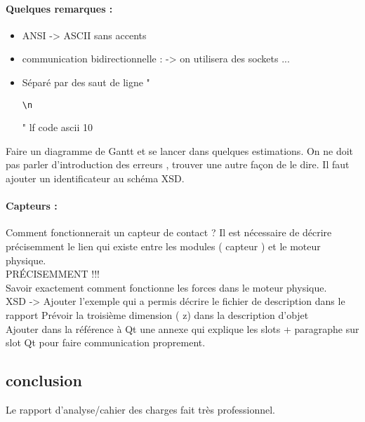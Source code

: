 \documentclass[a4paper,10pt]{article}
\begin{document}
\paragraph{Quelques remarques :}
\begin{itemize}
\item ANSI -> ASCII sans accents
\item communication bidirectionnelle : -> on utilisera des sockets {...}
\item Séparé par des saut de ligne "\begin{verbatim}\n\end{verbatim}" lf code ascii 10
\end{itemize}

Faire un diagramme de Gantt et se lancer dans quelques estimations. On
ne doit pas parler \og d'introduction des erreurs \fg, trouver une
autre façon de le dire. Il faut ajouter un identificateur au schéma XSD.
\paragraph{Capteurs : }
Comment fonctionnerait un capteur de contact ? Il est nécessaire de
décrire précisemment le lien qui existe entre les modules ( capteur )
et le moteur physique. \\
PRÉCISEMMENT !!!\\
Savoir exactement comment fonctionne les forces dans le moteur physique.\\
XSD -> Ajouter l'exemple qui a permis décrire le fichier de description dans le rapport
Prévoir la troisième dimension ( z) dans la description d'objet\\
Ajouter dans la référence à Qt une annexe qui explique les slots 
 + paragraphe sur slot Qt pour faire communication proprement.
 

\subsection*{conclusion}
Le rapport d'analyse/cahier des charges fait très professionnel. 
\end{document}
